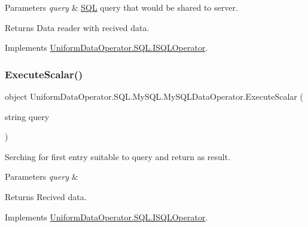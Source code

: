 \begin{DoxyParams}{Parameters}
{\em query} & \mbox{\hyperlink{namespace_uniform_data_operator_1_1_s_q_l}{S\+QL}} query that would be shared to server.\\
\hline
\end{DoxyParams}
\begin{DoxyReturn}{Returns}
Data reader with recived data.
\end{DoxyReturn}


Implements \mbox{\hyperlink{interface_uniform_data_operator_1_1_s_q_l_1_1_i_s_q_l_operator_a1f6dfa5dd14f7d52559b4e8f1ffda52e}{Uniform\+Data\+Operator.\+S\+Q\+L.\+I\+S\+Q\+L\+Operator}}.

\mbox{\label{class_uniform_data_operator_1_1_s_q_l_1_1_my_s_q_l_1_1_my_s_q_l_data_operator_a0dbc2a3ee5fb7768868138bbd2d9967e}} 
\subsubsection{\texorpdfstring{Execute\+Scalar()}{ExecuteScalar()}}
{\footnotesize\ttfamily object Uniform\+Data\+Operator.\+S\+Q\+L.\+My\+S\+Q\+L.\+My\+S\+Q\+L\+Data\+Operator.\+Execute\+Scalar (\begin{DoxyParamCaption}\item[{string}]{query }\end{DoxyParamCaption})}



Serching for first entry suitable to query and return as result. 


\begin{DoxyParams}{Parameters}
{\em query} & \\
\hline
\end{DoxyParams}
\begin{DoxyReturn}{Returns}
Recived data.
\end{DoxyReturn}


Implements \mbox{\hyperlink{interface_uniform_data_operator_1_1_s_q_l_1_1_i_s_q_l_operator_a8a39200efe4781edee40151982940f75}{Uniform\+Data\+Operator.\+S\+Q\+L.\+I\+S\+Q\+L\+Operator}}.

